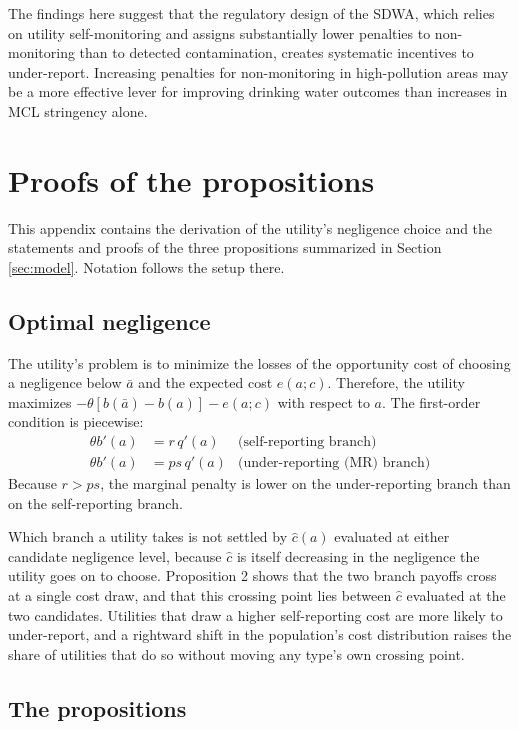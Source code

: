 \documentclass[12pt]{article}
\begin{document}
The findings here suggest that the regulatory design of the SDWA, which relies on utility self-monitoring and assigns substantially lower penalties to non-monitoring than to detected contamination, creates systematic incentives to under-report. Increasing penalties for non-monitoring in high-pollution areas may be a more effective lever for improving drinking water outcomes than increases in MCL stringency alone.


\appendix

\section{Proofs of the propositions}\label{app:proofs}

This appendix contains the derivation of the utility's negligence choice and the statements and proofs of the three propositions summarized in Section \ref{sec:model}. Notation follows the setup there.

	\subsection{Optimal negligence}
	
	The utility's problem is to minimize the losses of the opportunity cost of choosing a negligence below $\bar{a}$ and the expected cost $e(a;c)$. Therefore, the utility maximizes $-\theta[b(\bar{a}) - b(a)] - e(a;c)$ with respect to $a$.
    The first-order condition is piecewise:
	\begin{align}
		\theta b'(a) &= r\, q'(a) & \text{(self-reporting branch)} \\
		\theta b'(a) &= ps\, q'(a) & \text{(under-reporting (MR) branch)}
	\end{align}
	Because $r > ps$, the marginal penalty is lower on the under-reporting branch than on the self-reporting branch.
    
    Which branch a utility takes is not settled by $\hat{c}(a)$ evaluated at either candidate negligence level, because $\hat{c}$ is itself decreasing in the negligence the utility goes on to choose. Proposition 2 shows that the two branch payoffs cross at a single cost draw, and that this crossing point lies between $\hat{c}$ evaluated at the two candidates. Utilities that draw a higher self-reporting cost are more likely to under-report, and a rightward shift in the population's cost distribution raises the share of utilities that do so without moving any type's own crossing point.
	
	\subsection{The propositions}
	
\end{document}
